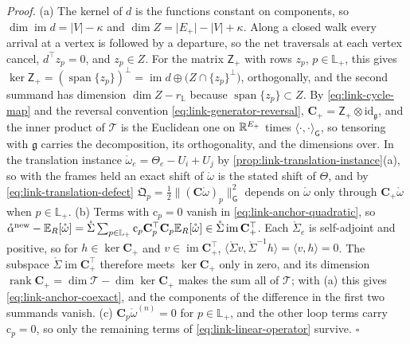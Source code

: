 \noindent\emph{Proof.}
(a) The kernel of $d$ is the functions constant on components, so
$\dim\operatorname{im}d=\lvert V\rvert-\kappa$ and $\dim Z=\lvert E_+\rvert-\lvert V\rvert+\kappa$. Along a
closed walk every arrival at a vertex is followed by a departure, so the net traversals at each vertex
cancel, $d^\top z_p=0$, and $z_p\in Z$. For the matrix $\mathsf Z_+$ with rows $z_p$, $p\in\mathbb L_+$,
this gives $\ker\mathsf Z_+=(\operatorname{span}\{z_p\})^\perp=\operatorname{im}d\oplus\bigl(Z\cap\{z_p\}^\perp\bigr)$,
orthogonally, and the second summand has dimension $\dim Z-r_{\mathbb L}$ because
$\operatorname{span}\{z_p\}\subset Z$. By \eqref{eq:link-cycle-map} and the reversal convention
\eqref{eq:link-generator-reversal}, $\mathbf C_+=\mathsf Z_+\otimes\mathrm{id}_{\mathfrak g}$, and the inner product
of $\mathscr T$ is the Euclidean one on $\mathbb R^{E_+}$ times $\langle\cdot,\cdot\rangle_{\mathsf G}$, so tensoring with
$\mathfrak g$ carries the decomposition, its orthogonality, and the dimensions over. In the translation
instance $\mathring\omega_e=\Theta_e-U_i+U_j$ by \cref{prop:link-translation-instance}(a), so with the frames
held an exact shift of $\mathring\omega$ is the stated shift of $\Theta$, and by
\eqref{eq:link-translation-defect} $\mathfrak Q_p=\tfrac12\lVert(\mathbf C\mathring\omega)_p\rVert_{\mathsf G}^2$
depends on $\mathring\omega$ only through $\mathbf C_+\mathring\omega$ when $p\in\mathbb L_+$.
(b) Terms with $\mathrm c_p=0$ vanish in \eqref{eq:link-anchor-quadratic}, so
$\mathring\alpha^{\mathrm{new}}-\mathbb E_R[\mathring\omega]=\mathring\Sigma\sum_{p\in\mathbb L_+}\mathrm c_p\mathbf C_p^\top\mathbf C_p\mathbb E_R[\mathring\omega]\in\mathring\Sigma\operatorname{im}\mathbf C_+^\top$.
Each $\mathring\Sigma_e$ is self-adjoint and positive, so for $h\in\ker\mathbf C_+$ and
$v\in\operatorname{im}\mathbf C_+^\top$, $\langle\mathring\Sigma v,\mathring\Sigma^{-1}h\rangle=\langle v,h\rangle=0$.
The subspace $\mathring\Sigma\operatorname{im}\mathbf C_+^\top$ therefore meets $\ker\mathbf C_+$ only in zero, and its
dimension $\operatorname{rank}\mathbf C_+=\dim\mathscr T-\dim\ker\mathbf C_+$ makes the sum all of $\mathscr T$; with
(a) this gives \eqref{eq:link-anchor-coexact}, and the components of the difference in the first two
summands vanish. (c) $\mathbf C_p\mathring\omega^{(n)}=0$ for $p\in\mathbb L_+$, and the other loop terms carry
$\mathrm c_p=0$, so only the remaining terms of \eqref{eq:link-linear-operator} survive. $\square$

